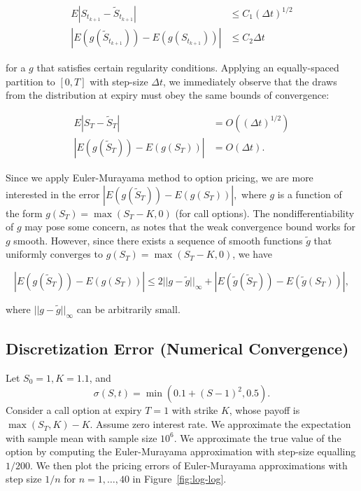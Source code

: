 \documentclass[11pt]{article}
\numberwithin{equation}{section}
\newcommand{\abs}[1]{\left|#1\right|}
\newcommand{\norm}[1]{||#1||}
\newcommand{\pr}[1]{\left(#1\right)}
\begin{document}
\begin{align}
E\abs{S_{t_{k+1}} - \tilde S_{t_{k+1}}} &\le C_1(\Delta t)^{1/2}
\tag{Strong convergence} \\ 
\abs{E(g(\tilde S_{t_{k+1}})) - E (g(S_{t_{k+1}}))} &\le C_2
\Delta t \tag{Weak convergence}
\end{align}

for a $g$ that satisfies certain regularity conditions. 
Applying an equally-spaced partition to $[0,T]$ with step-size $\Delta t$, we
immediately observe that the draws from the distribution at expiry must obey the
same bounds of convergence:

\begin{align*}
E\abs{S_{T} - \tilde S_{T}} &= O\pr{(\Delta t)^{1/2}} \\
\abs{E(g(\tilde S_{{T}})) - E (g(S_{T}))} &= O(\Delta t).
\end{align*}

Since we apply Euler-Murayama method to option pricing, we are more interested
in the error $\abs{E(g(\tilde S_T)) - E(g(S_T))},$ where $g$ is a function of
the form $g(S_T) = \max(S_T - K, 0)$ (for call options). The
nondifferentiability of $g$ may pose some concern, as
\cite{higham2001algorithmic} notes that the weak convergence bound works for $g$
smooth. However, since there exists a sequence of smooth functions $\tilde g$
that uniformly converges to $g(S_T) = \max(S_T - K, 0)$, we have 

\[
\abs{E(g(\tilde S_T)) - E(g(S_T))} \le 2\norm{g-\tilde g}_\infty + \abs{E(\tilde
g(\tilde S_{{T}})) - E (\tilde g(S_{T}))},
\]

where $\norm{g-\tilde g}_\infty$ can be arbitrarily small. 

\subsection{Discretization Error (Numerical Convergence)}

Let $S_0 = 1, K = 1.1$, and \[\sigma(S, t) = \min\pr{0.1 + (S - 1)^2, 0.5}.\]
Consider a call option at expiry $T = 1$ with strike $K$, whose payoff is
$\max(S_T, K) - K$. Assume zero interest rate. We approximate the expectation
with sample mean with sample size $10^6$. We approximate the true value of the
option by computing the Euler-Murayama approximation with step-size equalling
$1/200$. We then plot the pricing errors of Euler-Murayama approximations with
step size $1/n$ for $n=1,\ldots,40$ in Figure~\ref{fig:log-log}. 
\end{document}
